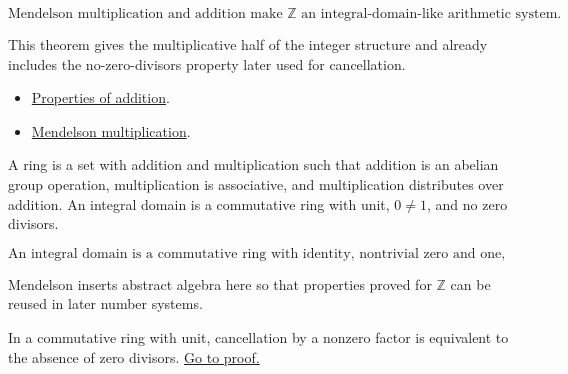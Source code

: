 \begin{remark*}
\[
  \text{Mendelson multiplication and addition make } \mathbb{Z}
  \text{ an integral-domain-like arithmetic system.}
\]
\end{remark*}

\begin{remark*}[Interpretation]
This theorem gives the multiplicative half of the integer structure and
already includes the no-zero-divisors property later used for cancellation.
\end{remark*}

\begin{dependencies}
\begin{itemize}
  \item \hyperref[thm:men-add]{Properties of addition}.
  \item \hyperref[def:men-multiplication]{Mendelson multiplication}.
\end{itemize}
\end{dependencies}

\begin{definition}
\label{def:men-ring-integral-domain}
A ring is a set with addition and multiplication such that addition is an
abelian group operation, multiplication is associative, and multiplication
distributes over addition. An integral domain is a commutative ring with unit,
\(0\neq 1\), and no zero divisors.
\end{definition}

\begin{remark*}
\[
  \text{An integral domain is a commutative ring with identity, nontrivial
  zero and one, and no zero divisors.}
\]
\end{remark*}

\begin{remark*}[Interpretation]
Mendelson inserts abstract algebra here so that properties proved for
\(\mathbb{Z}\) can be reused in later number systems.
\end{remark*}

\DefinitionalRoot

\begin{theorem}
\label{thm:men-cancel-equiv}
In a commutative ring with unit, cancellation by a nonzero factor is equivalent
to the absence of zero divisors.
\hyperref[prf:men-cancel-equiv]{Go to proof.}
\end{theorem}

